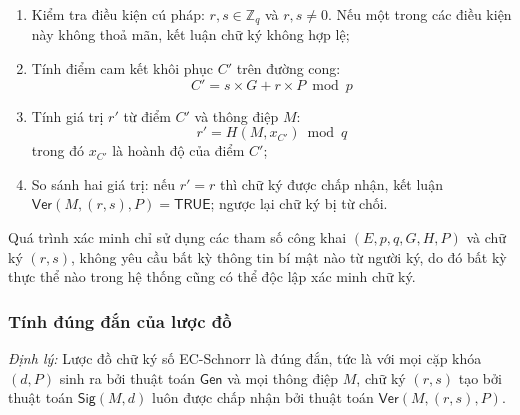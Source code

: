 \begin{enumerate}
    \item Kiểm tra điều kiện cú pháp: $r, s \in \mathbb{Z}_q$ và $r, s \neq 0$. Nếu một trong các điều kiện này không thoả mãn, kết luận chữ ký không hợp lệ;
    \item Tính điểm cam kết khôi phục $C'$ trên đường cong:
    \begin{equation}
        C' = s \times G + r \times P \bmod p
        \label{eq:ec-schnorr-verify-c}
    \end{equation}
    \item Tính giá trị $r'$ từ điểm $C'$ và thông điệp $M$:
    \begin{equation}
        r' = H(M, x_{C'}) \bmod q
        \label{eq:ec-schnorr-verify-r}
    \end{equation}
    trong đó $x_{C'}$ là hoành độ của điểm $C'$;
    \item So sánh hai giá trị: nếu $r' = r$ thì chữ ký được chấp nhận, kết luận $\textsf{Ver}(M, (r,s), P) = \textsf{TRUE}$; ngược lại chữ ký bị từ chối.
\end{enumerate}

Quá trình xác minh chỉ sử dụng các tham số công khai $(E, p, q, G, H, P)$ và chữ ký $(r,s)$, không yêu cầu bất kỳ thông tin bí mật nào từ người ký, do đó bất kỳ thực thể nào trong hệ thống cũng có thể độc lập xác minh chữ ký.

\subsubsection{Tính đúng đắn của lược đồ}

\textit{Định lý:} Lược đồ chữ ký số EC-Schnorr là đúng đắn, tức là với mọi cặp khóa $(d, P)$ sinh ra bởi thuật toán $\textsf{Gen}$ và mọi thông điệp $M$, chữ ký $(r, s)$ tạo bởi thuật toán $\textsf{Sig}(M, d)$ luôn được chấp nhận bởi thuật toán $\textsf{Ver}(M, (r,s), P)$.

